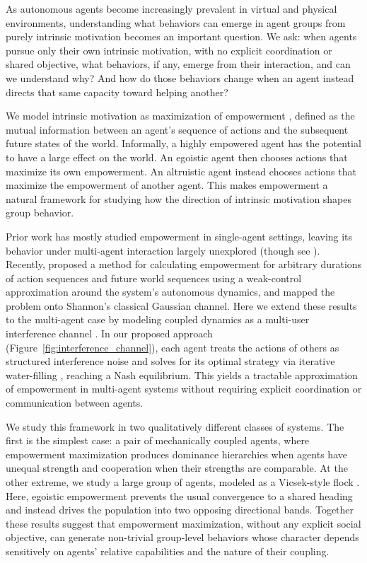 \documentclass{article} %
\begin{document}

As autonomous agents become increasingly prevalent in virtual and physical environments, understanding what behaviors can emerge in agent groups from purely intrinsic motivation becomes an important question. We ask: when agents pursue only their own intrinsic motivation, with no explicit coordination or shared objective, what behaviors, if any, emerge from their interaction, and can we understand why? And how do those behaviors change when an agent instead directs that same capacity toward helping another?

We model intrinsic motivation as maximization of empowerment \citep{klyubin2005empowerment, salge2014empowerment}, defined as the mutual information between an agent's sequence of actions and the subsequent future states of the world. Informally, a highly empowered agent has the potential to have a large effect on the world. An egoistic agent then chooses actions that maximize its own empowerment. An altruistic agent instead chooses actions that maximize the empowerment of another agent. This makes empowerment a natural framework for studying how the direction of intrinsic motivation shapes group behavior.

Prior work has mostly studied empowerment in single-agent settings, leaving its behavior under multi-agent interaction largely unexplored (though see \citealt{capdepuy2012perception, capdepuy2007maximization, salge2017empowerment, charlesworth_flocking}). Recently, \citet{tiomkin_2024} proposed a method for calculating empowerment for arbitrary durations of action sequences and future world sequences using a weak-control approximation around the system's autonomous dynamics, and mapped the problem onto Shannon's classical Gaussian channel. Here we extend these results to the multi-agent case by modeling coupled dynamics as a multi-user interference channel \citep{carleial_1978}. In our proposed approach (Figure~\ref{fig:interference_channel}), each agent treats the actions of others as structured interference noise and solves for its optimal strategy via iterative water-filling \citep{yu_2004}, reaching a Nash equilibrium. This yields a tractable approximation of empowerment in multi-agent systems without requiring explicit coordination or communication between agents.

We study this framework in two qualitatively different classes of systems. The first is the simplest case: a pair of mechanically coupled agents, where empowerment maximization produces dominance hierarchies when agents have unequal strength and cooperation when their strengths are comparable. At the other extreme, we study a large group of agents, modeled as a Vicsek-style flock \citep{vicsek_1995}. Here, egoistic empowerment prevents the usual convergence to a shared heading and instead drives the population into two opposing directional bands. Together these results suggest that empowerment maximization, without any explicit social objective, can generate non-trivial group-level behaviors whose character depends sensitively on agents' relative capabilities and the nature of their coupling.
\end{document}
